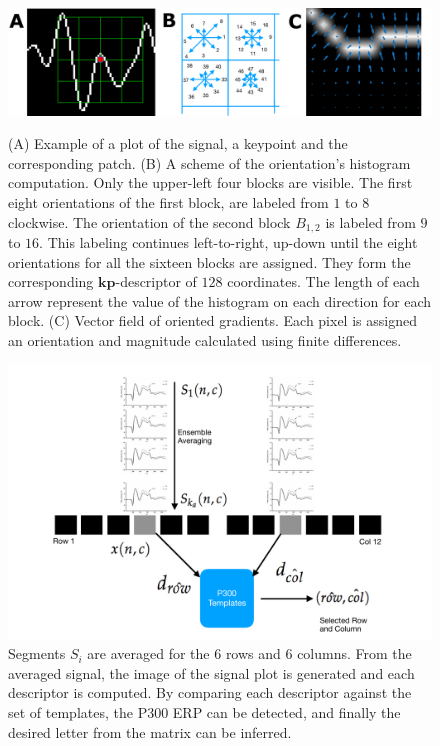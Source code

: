 \documentclass[utf8]{frontiersSCNS} %
\begin{document}
\begin{figure}[h!]
\centering
\includegraphics[width=16cm]{gradients.png}\label{samplegradients}
\caption{ (A) Example of a plot of the signal, a keypoint and the corresponding patch. (B) A scheme of the orientation's histogram computation.  Only the upper-left four blocks are visible.  The first eight orientations of the first block, are labeled from $1$ to $8$ clockwise. The orientation of the second block $ B_{1,2} $ is labeled from $9$ to $16$.  This labeling continues left-to-right, up-down until the eight orientations for all the sixteen blocks are assigned. They form the corresponding $\mathbf{kp}$-descriptor of $128$ coordinates.  The length of each arrow represent the value of the histogram on each direction for each block. (C) Vector field of oriented gradients.  Each pixel is assigned an orientation and magnitude calculated  using finite differences. }
\label{fig:sampledescriptor}
\end{figure}

\begin{figure}[h!]
\centering
\includegraphics[width=15cm]{classificationgraph.pdf}
\caption{Segments $S_i$ are averaged for the 6 rows and 6 columns. From the averaged signal, the image of the signal plot is generated and each descriptor is computed.  By comparing each descriptor against the set of templates, the P300 ERP can be detected, and finally the desired letter from the matrix can be inferred.}
\label{fig:classification}
\end{figure}
\end{document}
